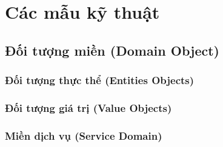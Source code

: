 



\chapter{Các mẫu kỹ thuật}

% 

\section{Đối tượng miền (Domain Object)}

% 

\subsection{Đối tượng thực thể (Entities Objects)}



\subsection{Đối tượng giá trị (Value Objects)}


% 

\subsection{Miền dịch vụ (Service Domain)}

% 




% 



